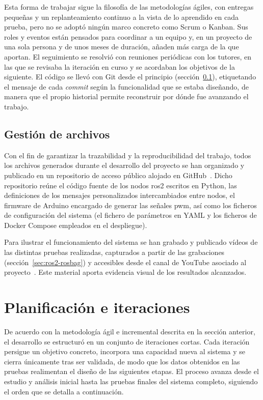 Esta forma de trabajar sigue la filosofía de las metodologías ágiles, con entregas pequeñas y un replanteamiento continuo a la vista de lo aprendido en cada prueba, pero no se adoptó ningún marco concreto como Scrum o Kanban.
Sus roles y eventos están pensados para coordinar a un equipo y, en un proyecto de una sola persona y de unos meses de duración, añaden más carga de la que aportan. El seguimiento se resolvió con reuniones periódicas con los tutores, en las que se revisaba la iteración en curso y se acordaban los objetivos de la siguiente. El código se llevó con Git desde el principio (sección~\ref{sec:xestion-arquivos}), etiquetando el mensaje de cada \textit{commit} según la funcionalidad que se estaba diseñando, de manera que el propio historial permite reconstruir por dónde fue avanzando el trabajo.

\subsection{Gestión de archivos}
\label{sec:xestion-arquivos}

Con el fin de garantizar la trazabilidad y la reproducibilidad del trabajo, todos los archivos generados durante el desarrollo del proyecto se han organizado y publicado en un repositorio de acceso público alojado en GitHub~\cite{repogithub}. Dicho repositorio reúne el código fuente de los nodos \gls{ros2} escritos en Python, las definiciones de los mensajes personalizados intercambiados entre nodos, el firmware de Arduino encargado de generar las señales \gls{pwm}, así como los ficheros de configuración del sistema (el fichero de parámetros en YAML y los ficheros de Docker Compose empleados en el despliegue).

Para ilustrar el funcionamiento del sistema se han grabado y publicado vídeos de las distintas pruebas realizadas, capturados a partir de las grabaciones (sección~\ref{sec:ros2-rosbag}) y accesibles desde el canal de YouTube asociado al proyecto~\cite{canalyoutube}. Este material aporta evidencia visual de los resultados alcanzados.


\section{Planificación e iteraciones}
\label{sec:planificacion-iteraciones}

De acuerdo con la metodología ágil e incremental descrita en la sección anterior, el desarrollo se estructuró en un conjunto de iteraciones cortas. Cada iteración persigue un objetivo concreto, incorpora una capacidad nueva al sistema y se cierra únicamente tras ser validada, de modo que los datos obtenidos en las pruebas realimentan el diseño de las siguientes etapas. El proceso avanza desde el estudio y análisis inicial hasta las pruebas finales del sistema completo, siguiendo el orden que se detalla a continuación.


